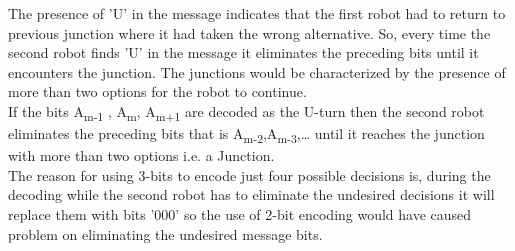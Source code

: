\justify The presence of 'U' in the message indicates that the first robot had to return to previous junction where it had taken the wrong alternative. So, every time the second robot finds 'U' in the message it eliminates the preceding bits until it encounters the junction. The junctions would be characterized by the presence of more than two options for the robot to continue.\\
If the bits  A\textsubscript{m-1} , A\textsubscript{m}, A\textsubscript{m+1} are decoded as the U-turn then the second robot eliminates the preceding bits that is  A\textsubscript{m-2},A\textsubscript{m-3},…  until it reaches the junction with more than two options i.e.  a Junction.\\ 
The reason for using 3-bits to encode just four possible decisions is, during the decoding  while the second robot has to eliminate the undesired decisions it will replace them with bits '000' so the use of 2-bit encoding would have caused problem on eliminating the undesired message bits. 
